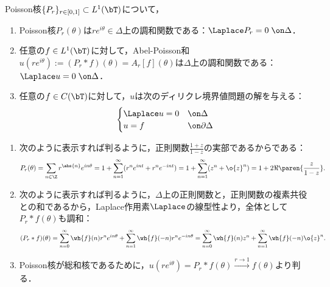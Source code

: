 \documentclass[uplatex,dvipdfmx]{jsreport}
\begin{document}
\begin{proposition}[SchwartzによるDirichlet境界値問題の解決]
    Poisson核$\{P_r\}_{r\in[0,1]}\subset L^1(\bT)$について，
    \begin{enumerate}
        \item Poisson核$P_r(\theta)$は$re^{i\theta}\in\Delta$上の調和関数である：$\Laplace P_r=0\;\on\Delta$．
        \item 任意の$f\in L^1(\bT)$に対して，Abel-Poisson和$u(re^{i\theta}):=(P_r*f)(\theta)=A_r[f](\theta)$は$\Delta$上の調和関数である：$\Laplace u=0\;\on\Delta$．
        \item 任意の$f\in C(\bT)$に対して，$u$は次のディリクレ境界値問題の解を与える：
        \[\begin{cases}
            \Laplace u=0&\on\Delta\\
            u=f&\on\partial\Delta
        \end{cases}\]
    \end{enumerate}
\end{proposition}
\begin{Proof}\mbox{}
    \begin{enumerate}
        \item 次のように表示すれば判るように，正則関数$\frac{1+z}{1-z}$の実部であるからである：
        \[P_r(\theta)=\sum_{n\in\Z}r^{\abs{n}}e^{in\theta}=1+\sum_{n=1}^\infty (r^ne^{int}+r^ne^{-int})=1+\sum_{n=1}^\infty(z^n+\o{z}^n)=1+2\Re\paren{\frac{z}{1-z}}.\]
        \item 次のように表示すれば判るように，$\Delta$上の正則関数と，正則関数の複素共役との和であるから，Laplace作用素$\Laplace$の線型性より，全体として$P_r*f(\theta)$も調和：
        \[(P_r*f)(\theta)=\sum_{n=0}^\infty\wh{f}(n)r^ne^{in\theta}+\sum_{n=1}^\infty\wh{f}(-n)r^ne^{-in\theta}=\sum_{n=0}^\infty\wh{f}(n)z^n+\sum_{n=1}^\infty\wh{f}(-n)\o{z}^n.\]
        \item Poisson核が総和核であるために，$u(re^{i\theta})=P_r*f(\theta)\xrightarrow{r\to1}f(\theta)$より判る．
    \end{enumerate}
\end{Proof}
\end{document}
